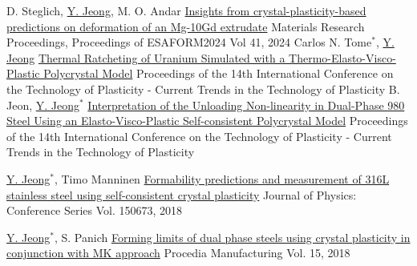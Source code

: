 
\begin{cventries}

\item
  \cventry
  {D. Steglich, \underline{Y. Jeong}, M. O. Andar}
  {\href{https://doi.org/10.21741/9781644903131-121}{Insights from crystal-plasticity-based predictions on deformation of an Mg-10Gd extrudate}}
  {Materials Research Proceedings, Proceedings of ESAFORM2024}
  {Vol 41, 2024}
  {
  }
  \cventry
  {Carlos N. Tome$^*$, \underline{Y. Jeong}}
  {\href{https://doi.org/10.1007/978-3-031-40920-2_68}{Thermal Ratcheting of Uranium Simulated with a Thermo-Elasto-Visco-Plastic Polycrystal Model}}
  {Proceedings of the 14th International Conference on the Technology of Plasticity - Current Trends in the Technology of Plasticity}
  {}
  {
  }
  \cventry
  {B. Jeon, \underline{Y. Jeong}$^*$}
  {\href{https://doi.org/10.1007/978-3-031-40920-2_69}{Interpretation of the Unloading Non-linearity in Dual-Phase 980 Steel Using an Elasto-Visco-Plastic Self-consistent Polycrystal Model}}
  {Proceedings of the 14th International Conference on the Technology of Plasticity - Current Trends in the Technology of Plasticity}
  {}
  {
  }

  \cventry
  {\underline{Y. Jeong}$^*$, Timo Manninen}
  {\href{http://iopscience.iop.org/article/10.1088/1742-6596/1063/1/012020}{Formability predictions and measurement of 316L stainless steel using self-consistent crystal plasticity}}
  {Journal of Physics: Conference Series}
  {Vol. 150673, 2018}
  {
  }

  \cventry
  {\underline{Y. Jeong}$^*$, S. Panich}
  {\href{https://doi.org/10.1016/j.promfg.2018.07.209}{Forming limits of dual phase steels using crystal plasticity in conjunction with MK approach}}
  {Procedia Manufacturing}
  {Vol. 15, 2018}
  {
  }


\end{cventries}
